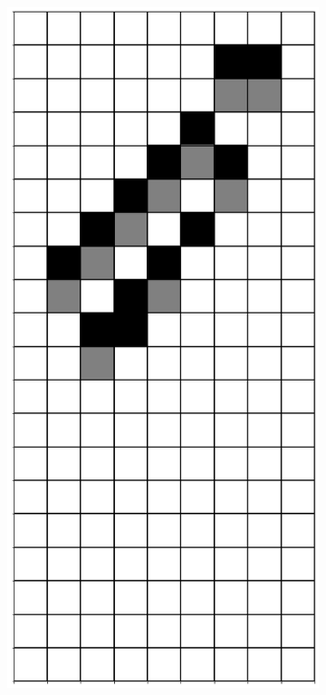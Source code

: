 \documentclass[12pt]{article}
\numberwithin{figure}{section} %
\begin{document}
\begin{figure}[H]
\begin{subfigure}{0.3\textwidth}
     		\subcaption{}
   	\end{subfigure}
        \begin{subfigure}{0.3\textwidth}
     		\centering
     		\includegraphics[angle=270,width=\linewidth]{Section4/22.8}

\end{subfigure}
\end{figure}
\end{document}
